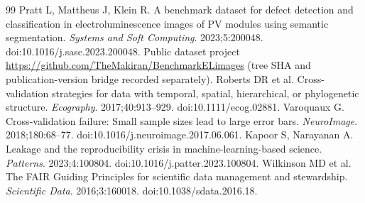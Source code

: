 \documentclass[10pt,a4paper]{article}
\begin{document}
\begin{thebibliography}{99}
 Pratt L, Mattheus J, Klein R. A benchmark dataset for defect detection and classification in electroluminescence images of PV modules using semantic segmentation. \emph{Systems and Soft Computing}. 2023;5:200048. doi:10.1016/j.sasc.2023.200048. Public dataset project \url{https://github.com/TheMakiran/BenchmarkELimages} (tree SHA and publication-version bridge recorded separately).
 Roberts DR et al. Cross-validation strategies for data with temporal, spatial, hierarchical, or phylogenetic structure. \emph{Ecography}. 2017;40:913--929. doi:10.1111/ecog.02881.
 Varoquaux G. Cross-validation failure: Small sample sizes lead to large error bars. \emph{NeuroImage}. 2018;180:68--77. doi:10.1016/j.neuroimage.2017.06.061.
 Kapoor S, Narayanan A. Leakage and the reproducibility crisis in machine-learning-based science. \emph{Patterns}. 2023;4:100804. doi:10.1016/j.patter.2023.100804.
 Wilkinson MD et al. The FAIR Guiding Principles for scientific data management and stewardship. \emph{Scientific Data}. 2016;3:160018. doi:10.1038/sdata.2016.18.
\end{thebibliography}
\end{document}

